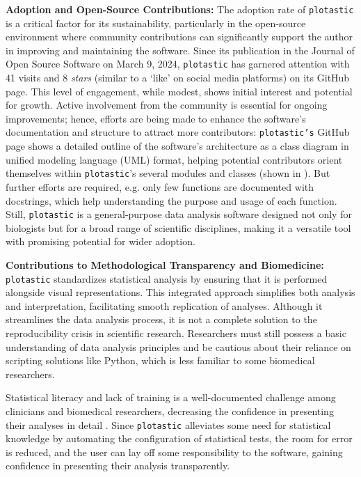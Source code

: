 \textbf{Adoption and Open-Source Contributions:}
The adoption rate of \texttt{plotastic} is a critical factor for its
sustainability, particularly in the open-source environment where community
contributions can significantly support the author in improving and maintaining
the software. Since its publication in the Journal of Open Source Software on
March 9, 2024, \texttt{plotastic} has garnered attention with 41 visits and 8
\emph{stars} (similar to a `like' on social media platforms) on its GitHub page.
This level of engagement, while modest, shows initial interest and potential for
growth. Active involvement from the community is essential for ongoing
improvements; hence, efforts are being made to enhance the software's
documentation and structure to attract more contributors: \texttt{plotastic's}
GitHub page shows a detailed outline of the software's architecture as a class
diagram in unified modeling language (UML) format, helping potential
contributors orient themselves within \texttt{plotastic}'s several modules and
classes (shown in ). But further efforts are
required, e.g. only few functions are documented with docstrings, which help
understanding the purpose and usage of each function. Still, \texttt{plotastic}
is a general-purpose data analysis software designed not only for biologists but
for a broad range of scientific disciplines, making it a versatile tool with
promising potential for wider adoption.





\textbf{Contributions to Methodological Transparency and Biomedicine:}
\texttt{plotastic} standardizes statistical analysis by ensuring that it is
performed alongside visual representations. This integrated approach simplifies
both analysis and interpretation, facilitating smooth replication of analyses.
Although it streamlines the data analysis process, it is not a complete solution
to the reproducibility crisis in scientific research. Researchers must still
possess a basic understanding of data analysis principles and be cautious about
their reliance on scripting solutions like Python, which is less familiar to
some biomedical researchers.

Statistical literacy and lack of training is a well-documented challenge among
clinicians and biomedical researchers, decreasing the confidence in
presenting their analyses in detail
\cite{lakhlifiIllusionKnowledgeStatistics2023, federerDataLiteracyTraining2016}.
Since \texttt{plotastic} alleviates some need for statistical knowledge by
automating the configuration of statistical tests, the room for error is
reduced, and the user can lay off some responsibility to the software, gaining
confidence in presenting their analysis transparently.

